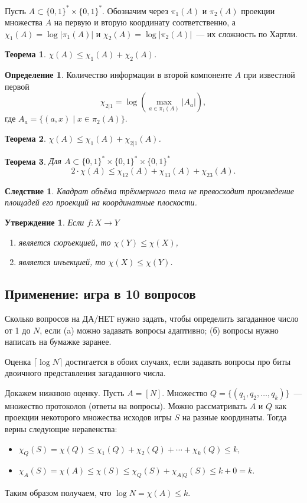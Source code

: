 \documentclass[12pt]{article}
\newcommand{\binstr}{\{0,1\}^*}
\newcommand{\seqn}[2]{{#1}_1,{#1}_2,\dotsc,{#1}_{#2}}
\theoremstyle{definition}
\newtheorem{definition}{Определение}
\theoremstyle{plain}
\newtheorem{theorem}{Теорема}[section]
\newtheorem{statement}{Утверждение}[section]
\newtheorem{corollary}{Следствие}[section]
\theoremstyle{remark}
\begin{document}
Пусть \(A\subset\binstr\times\binstr\). Обозначим через \(\pi_1(A)\) и \(\pi_2(A)\) проекции множества \(A\) на первую и вторую координату соответственно, а \(\chi_1(A) = \log|\pi_1(A)|\) и \(\chi_2(A) = \log|\pi_2(A)|\)~--- их сложность по Хартли.

\begin{theorem} 
\(\chi(A) \le \chi_1(A) + \chi_2(A)\).
\end{theorem}

\begin{definition}
Количество информации в второй компоненте \(A\) при известной первой
\[\chi_{2|1} = \log\left(\max_{a\in\pi_1(A)} |A_a|\right),\]
где $A_a = \{(a, x) \mid x\in \pi_2(A)\}$.
\end{definition}

\begin{theorem} 
\(\chi(A) \le \chi_1(A) + \chi_{2|1}(A)\).
\end{theorem}

\begin{theorem}\label{thm:volume}
Для \(A\subset\binstr\times\binstr\times\binstr\)
\[2\cdot\chi(A) \le \chi_{12}(A) + \chi_{13}(A) + \chi_{23}(A).\]
\end{theorem}
\begin{corollary}
Квадрат объёма трёхмерного тела не превосходит произведение площадей его проекций на координатные плоскости.
\end{corollary}

\begin{statement}
Если \(f: X\to Y\)
\begin{enumerate}
    \item является сюръекцией, то \(\chi(Y)\le \chi(X)\),
    \item является инъекцией, то \(\chi(X)\le \chi(Y)\).
\end{enumerate}
\end{statement}

\subsection{Применение: игра в 10 вопросов}
Сколько вопросов на ДА/НЕТ нужно задать, чтобы определить загаданное число от 1 до \(N\), если (a) можно задавать вопросы адаптивно; (б) вопросы нужно написать на бумажке заранее.

Оценка \(\lceil\log N\rceil \) достигается в обоих случаях, если задавать вопросы про биты двоичного представления загаданного числа.

Докажем нижнюю оценку. Пусть \(A=[N]\). Множество \(Q = \{(\seqn{q}{k})\}\)~--- множество протоколов (ответы на вопросы). 
Можно рассматривать \(A\) и \(Q\) как проекции некоторого множества исходов игры \(S\) на разные координаты. Тогда верны следующие неравенства:
\begin{itemize}
\item \( \chi_Q(S) = \chi(Q) \le \chi_1(Q) + \chi_2(Q) + \dotsb + \chi_k(Q) \le k, \)
\item \( \chi_A(S) = \chi(A) \le \chi(S) \le \chi_Q(S) + \chi_{A|Q}(S) \le k + 0 = k. \)
\end{itemize}
Таким образом получаем, что \(\log N = \chi(A) \le k\).
\end{document}
